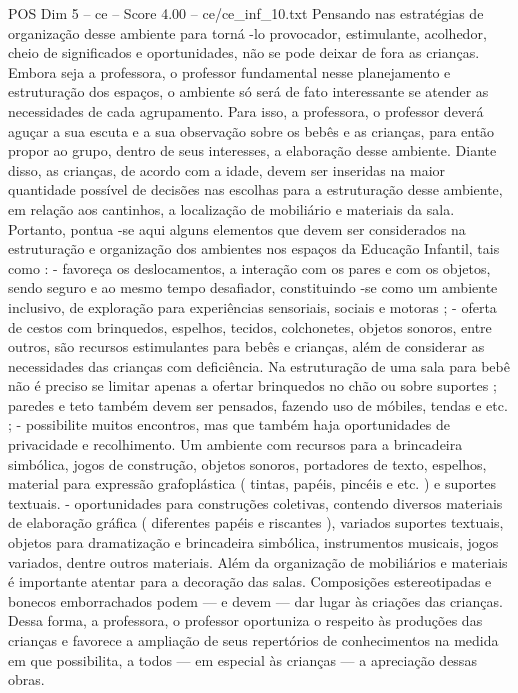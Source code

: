 \begin{textsample}{POS Dim 5 – ce – Score 4.00 – ce/ce\_inf\_10.txt}
Pensando nas estratégias de organização desse ambiente para torná -lo provocador, estimulante, acolhedor, cheio de significados e oportunidades, não se pode deixar de fora as crianças.
Embora seja a professora, o professor fundamental nesse planejamento e estruturação dos espaços, o ambiente só será de fato interessante se atender as necessidades de cada agrupamento.
Para isso, a professora, o professor deverá aguçar a sua escuta e a sua observação sobre os bebês e as crianças, para então propor ao grupo, dentro de seus interesses, a elaboração desse ambiente.
Diante disso, as crianças, de acordo com a idade, devem ser inseridas na maior quantidade possível de decisões nas escolhas para a estruturação desse ambiente, em relação aos cantinhos, a localização de mobiliário e materiais da sala.
Portanto, pontua -se aqui alguns elementos que devem ser considerados na estruturação e organização dos ambientes nos espaços da Educação Infantil, tais como : - favoreça os deslocamentos, a interação com os pares e com os objetos, sendo seguro e ao mesmo tempo desafiador, constituindo -se como um ambiente inclusivo, de exploração para experiências sensoriais, sociais e motoras ; - oferta de cestos com brinquedos, espelhos, tecidos, colchonetes, objetos sonoros, entre outros, são recursos estimulantes para bebês e crianças, além de considerar as necessidades das crianças com deficiência.
Na estruturação de uma sala para bebê não é preciso se limitar apenas a ofertar brinquedos no chão ou sobre suportes ; paredes e teto também devem ser pensados, fazendo uso de móbiles, tendas e etc. ; - possibilite muitos encontros, mas que também haja oportunidades de privacidade e recolhimento.
Um ambiente com recursos para a brincadeira simbólica, jogos de construção, objetos sonoros, portadores de texto, espelhos, material para expressão grafoplástica ( tintas, papéis, pincéis e etc. ) e suportes textuais. - oportunidades para construções coletivas, contendo diversos materiais de elaboração gráfica ( diferentes papéis e riscantes ), variados suportes textuais, objetos para dramatização e brincadeira simbólica, instrumentos musicais, jogos variados, dentre outros materiais.
Além da organização de mobiliários e materiais é importante atentar para a decoração das salas.
Composições estereotipadas e bonecos emborrachados podem — e devem — dar lugar às criações das crianças.
Dessa forma, a professora, o professor oportuniza o respeito às produções das crianças e favorece a ampliação de seus repertórios de conhecimentos na medida em que possibilita, a todos — em especial às crianças — a apreciação dessas obras.

\end{textsample}

